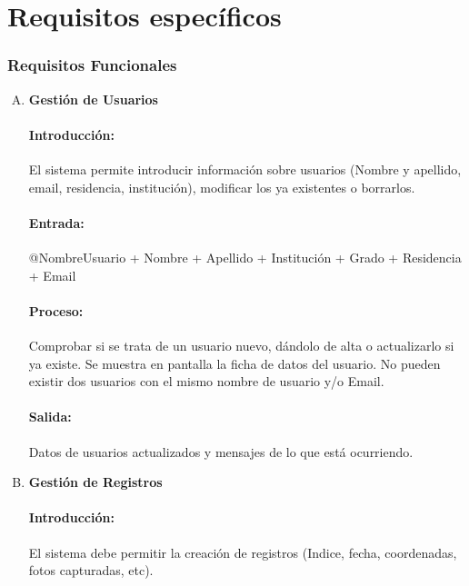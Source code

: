  \section{Requisitos específicos}
        \subsubsection{Requisitos Funcionales}
        
        \begin{enumerate}[A.]

        \item \textbf{Gestión de Usuarios}
        
        \paragraph{Introducción:} El sistema permite introducir información sobre usuarios (Nombre y apellido, email, residencia, institución), modificar los ya existentes o borrarlos.
        
        \paragraph{Entrada:} @NombreUsuario + Nombre + Apellido + Institución + Grado + Residencia + Email
        
        \paragraph{Proceso:} Comprobar si se trata de un usuario nuevo, dándolo de alta o actualizarlo si ya existe.
        Se muestra en pantalla la ficha de datos del usuario. No pueden existir dos usuarios con el mismo nombre de usuario y/o Email. 
        
        \paragraph{Salida:} Datos de usuarios actualizados y mensajes de lo que está ocurriendo.
        
        \item \textbf{Gestión de Registros}
        
        \paragraph{Introducción:} El sistema debe permitir la  creación de registros (Indice, fecha, coordenadas, fotos capturadas, etc). 
        

\end{enumerate}
